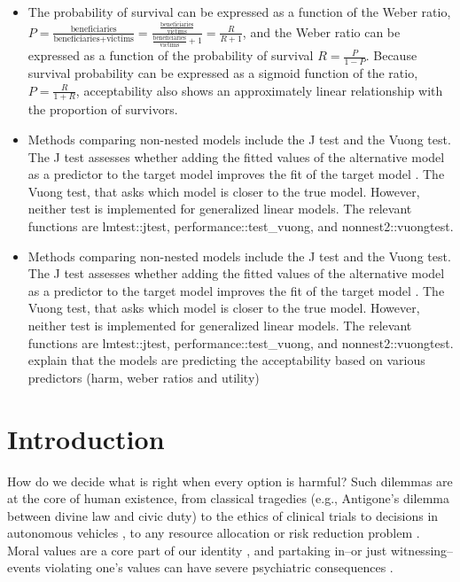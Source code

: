 \documentclass[
]{article}
\providecommand{\tightlist}{%
  \setlength{\itemsep}{0pt}\setlength{\parskip}{0pt}}
\begin{document}
\begin{itemize}
\tightlist
\item
  The probability of survival can be expressed as a function of the Weber ratio, \(P = \frac{\text{beneficiaries}}{\text{beneficiaries} + \text{victims}} = \frac{\frac{\text{beneficiaries}}{\text{victims}}}{\frac{\text{beneficiaries}}{\text{victims}} + 1} = \frac{R}{R + 1}\), and the Weber ratio can be expressed as a function of the probability of survival \(R = \frac{P}{1 - P}\). Because survival probability can be expressed as a sigmoid function of the ratio, \(P = \frac{R}{1+R}\), acceptability also shows an approximately linear relationship with the proportion of survivors.
\item
  Methods comparing non-nested models include the J test and the Vuong test. The J test assesses whether adding the fitted values of the alternative model as a predictor to the target model improves the fit of the target model \autocite{j-test}. The Vuong test, that asks which model is closer to the true model. However, neither test is implemented for generalized linear models. The relevant functions are lmtest::jtest, performance::test\_vuong, and nonnest2::vuongtest.\\
\item
  Methods comparing non-nested models include the J test and the Vuong test. The J test assesses whether adding the fitted values of the alternative model as a predictor to the target model improves the fit of the target model \autocite{j-test}. The Vuong test, that asks which model is closer to the true model. However, neither test is implemented for generalized linear models. The relevant functions are lmtest::jtest, performance::test\_vuong, and nonnest2::vuongtest. explain that the models are predicting the acceptability based on various predictors (harm, weber ratios and utility)
\end{itemize}

\clearpage

\section{Introduction}\label{introduction}

How do we decide what is right when every option is harmful? Such dilemmas are at the core of human existence, from classical tragedies (e.g., Antigone's dilemma between divine law and civic duty) to the ethics of clinical trials \autocite{Lipsitch2020} to decisions in autonomous vehicles \autocite{Awad2018}, to any resource allocation or risk reduction problem \autocite{Viscusi2003}. Moral values are a core part of our identity \autocite{Aquino2002}, and partaking in--or just witnessing--events violating one's values can have severe psychiatric consequences \autocite{Jinkerson2016}.
\end{document}

